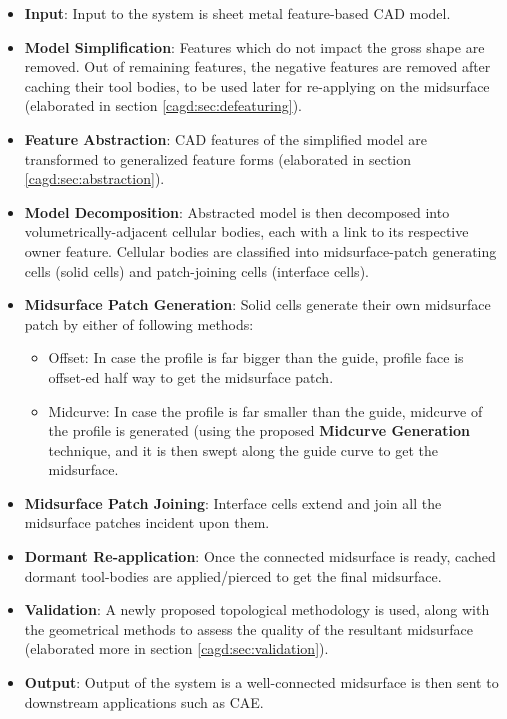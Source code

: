 \begin{itemize}[noitemsep,topsep=2pt,parsep=2pt,partopsep=2pt]
\item \textbf{Input}: Input to the system is sheet metal feature-based CAD model. 

\item \textbf{Model Simplification}: Features which do not impact the gross shape are removed. Out of remaining features, the negative features are removed after caching their tool bodies, to be used later for re-applying on the midsurface \cite{YogeshCADConf2015} (elaborated in section \ref{cagd:sec:defeaturing}). %

\item \textbf{Feature Abstraction}: CAD features of the simplified model are transformed to generalized feature forms \cite{YogeshIITG2014}  (elaborated in  section  \ref{cagd:sec:abstraction}). %

\item \textbf{Model Decomposition}: Abstracted model is then decomposed into volumetrically-adjacent cellular bodies, each with a link to its respective owner feature. Cellular bodies are  classified into midsurface-patch generating cells (solid cells) and patch-joining cells (interface cells).

\item \textbf{Midsurface Patch Generation}: Solid cells generate their own midsurface patch by either of following methods:
\begin{itemize}[noitemsep,topsep=2pt,parsep=2pt,partopsep=2pt]
\item Offset: In case the profile is far bigger than the guide, profile face is offset-ed half way to get the midsurface patch.
\item Midcurve: In case the profile is far smaller than the guide, midcurve of the profile is generated (using the proposed \textbf{Midcurve Generation} technique, and it is then swept along the guide curve to get the midsurface.
\end{itemize}
\item \textbf{Midsurface Patch Joining}: Interface cells extend and join all the midsurface patches incident upon them.
\item \textbf{Dormant Re-application}: Once the connected midsurface is ready, cached dormant tool-bodies are applied/pierced to get the final midsurface.

\item \textbf{Validation}: A newly proposed topological methodology is used, along with the geometrical methods to assess the quality of the resultant midsurface \cite{YogeshCADandA2015} (elaborated more in section \ref{cagd:sec:validation}).

\item \textbf{Output}: Output of the system is a well-connected midsurface is then sent to downstream applications such as CAE.
\end{itemize}

